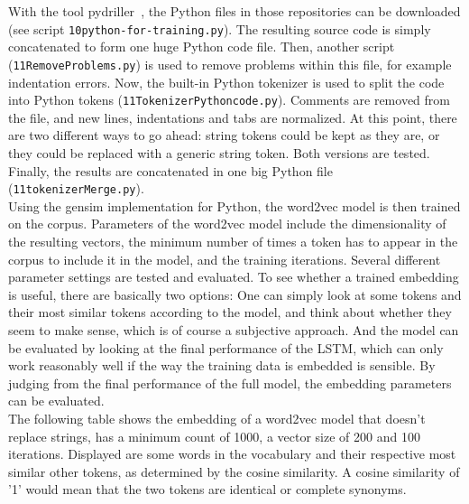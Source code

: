 \documentclass[
	a4paper,
	pagesize,
	pdftex,
	12pt,
	twoside, %
	BCOR=5mm, %
	ngerman,
	fleqn,
	final,
	]{scrartcl}
\begin{document}
\normalsize
With the tool pydriller~\cite{Spadini.2018}, the Python files in those repositories can be downloaded (see script \texttt{10python-for-training.py}). The resulting source code is simply concatenated to form one huge Python code file. Then, another script (\texttt{11RemoveProblems.py}) is used to remove problems within this file, for example indentation errors. Now, the built-in Python tokenizer is used to split the code into Python tokens (\texttt{11TokenizerPythoncode.py}). Comments are removed from the file, and new lines, indentations and tabs are normalized. At this point, there are two different ways to go ahead: string tokens could be kept as they are, or they could be replaced with a generic string token. Both versions are tested. Finally, the results are concatenated in one big Python file (\texttt{11tokenizerMerge.py}).\\
Using the gensim implementation for Python, the word2vec model is then trained on the corpus. Parameters of the word2vec model include the dimensionality of the resulting vectors, the minimum number of times a token has to appear in the corpus to include it in the model, and the training iterations. Several different parameter settings are tested and evaluated. To see whether a trained embedding is useful, there are basically two options: One can simply look at some tokens and their most similar tokens according to the model, and think about whether they seem to make sense, which is of course a subjective approach. And the model can be evaluated by looking at the final performance of the LSTM, which can only work reasonably well if the way the training data is embedded is sensible. By judging from the final performance of the full model, the embedding parameters can be evaluated.\\
The following table shows the embedding of a word2vec model that doesn't replace strings, has a minimum count of 1000, a vector size of 200 and 100 iterations. Displayed are some words in the vocabulary and their respective most similar other tokens, as determined by the cosine similarity. A cosine similarity of '1' would mean that the two tokens are identical or complete synonyms.
\end{document}
